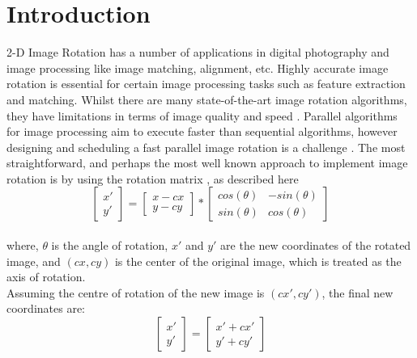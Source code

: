 \documentclass[conference]{IEEEtran}
\begin{document}
\begin{abstract}
    This paper presents a novel fast image rotation algorithm that leverages CPU parallelization while maintaining high image quality. The proposed method is a single-pass algorithm, derived from the existing Double-Line Rotation (DLR) method, which reduces computational complexity and generalizes the algorithm. Initially, a baseline for the given image is calculated to determine the starting line, which defines the initial point for each vertical or horizontal line in the image to be rotated. The corresponding pixels to be mapped are identified using floating point arithmetic, and trigonometric calculations are performed only once per line. This approach ensures precise image transformation with minimal computational overhead.
    \textit{Index terms:} Image rotation, line rotation image transform, double-line rotation (DLR), parallel image rotation.
\end{abstract}
\IEEEpeerreviewmaketitle
\section{Introduction}
2-D Image Rotation has a number of applications in digital photography and image processing like image matching, alignment, \cite{gaster2012heterogeneous} etc. Highly accurate image rotation is essential for certain image processing tasks such as feature extraction and matching. Whilst there are many state-of-the-art image rotation algorithms, they have limitations in terms of image quality and speed \cite{ashtari2015double} \cite{park2009accurate}.
Parallel algorithms for image processing aim to execute faster than sequential algorithms, however designing and scheduling a fast parallel image rotation is a challenge \cite{kwon2016study}.
The most straightforward, and perhaps the most well known approach to implement image rotation is by using the rotation matrix \cite{evans2001rotations}, as described here
$$\begin{bmatrix}
        x' \\
        y'
    \end{bmatrix} = \begin{bmatrix}
        x - cx \\
        y - cy
    \end{bmatrix} * \begin{bmatrix}
        cos(\theta) & -sin(\theta) \\
        sin(\theta) & cos(\theta)
    \end{bmatrix}$$\\
where, $\theta$ is the angle of rotation, $x'$ and $y'$ are the new coordinates of the rotated image, and $(cx, cy)$ is the center of the original image, which is treated as the axis of rotation.\\
Assuming the centre of rotation of the new image is $(cx', cy')$, the final new coordinates are:
$$\begin{bmatrix}
        x' \\
        y'
    \end{bmatrix} = \begin{bmatrix}
        x' + cx' \\
        y' + cy'
    \end{bmatrix}$$
\end{document}
